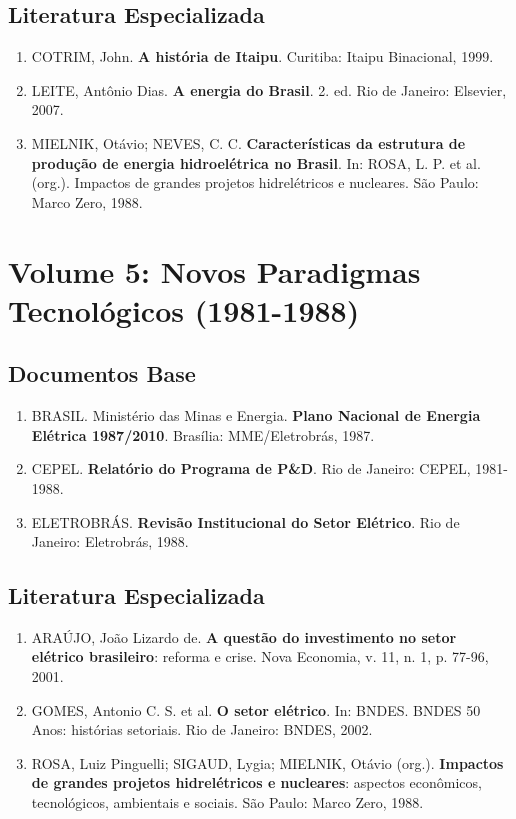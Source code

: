 \documentclass[12pt,a4paper]{report}
\begin{document}
\section*{Literatura Especializada}
\begin{enumerate}[leftmargin=*]
    \item COTRIM, John. \textbf{A história de Itaipu}. Curitiba: Itaipu Binacional, 1999.
    
    \item LEITE, Antônio Dias. \textbf{A energia do Brasil}. 2. ed. Rio de Janeiro: Elsevier, 2007.
    
    \item MIELNIK, Otávio; NEVES, C. C. \textbf{Características da estrutura de produção de energia hidroelétrica no Brasil}. In: ROSA, L. P. et al. (org.). Impactos de grandes projetos hidrelétricos e nucleares. São Paulo: Marco Zero, 1988.
\end{enumerate}

\chapter*{Volume 5: Novos Paradigmas Tecnológicos (1981-1988)}

\section*{Documentos Base}
\begin{enumerate}[leftmargin=*]
    \item BRASIL. Ministério das Minas e Energia. \textbf{Plano Nacional de Energia Elétrica 1987/2010}. Brasília: MME/Eletrobrás, 1987.
    
    \item CEPEL. \textbf{Relatório do Programa de P\&D}. Rio de Janeiro: CEPEL, 1981-1988.
    
    \item ELETROBRÁS. \textbf{Revisão Institucional do Setor Elétrico}. Rio de Janeiro: Eletrobrás, 1988.
\end{enumerate}

\section*{Literatura Especializada}
\begin{enumerate}[leftmargin=*]
    \item ARAÚJO, João Lizardo de. \textbf{A questão do investimento no setor elétrico brasileiro}: reforma e crise. Nova Economia, v. 11, n. 1, p. 77-96, 2001.
    
    \item GOMES, Antonio C. S. et al. \textbf{O setor elétrico}. In: BNDES. BNDES 50 Anos: histórias setoriais. Rio de Janeiro: BNDES, 2002.
    
    \item ROSA, Luiz Pinguelli; SIGAUD, Lygia; MIELNIK, Otávio (org.). \textbf{Impactos de grandes projetos hidrelétricos e nucleares}: aspectos econômicos, tecnológicos, ambientais e sociais. São Paulo: Marco Zero, 1988.
\end{enumerate}
\end{document}
